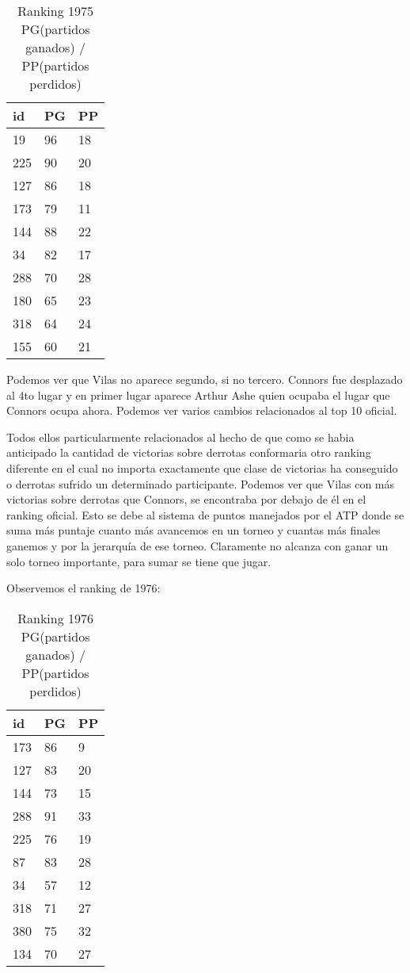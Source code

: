 \begin{table}[H]
\label{my-label}
\begin{tabular}{lll}
\hline
id  & PG & PP \\ \hline
19  & 96 & 18 \\
225 & 90 & 20 \\
127 & 86 & 18 \\
173 & 79 & 11 \\
144 & 88 & 22 \\
34  & 82 & 17 \\
288 & 70 & 28 \\
180 & 65 & 23 \\
318 & 64 & 24 \\
155 & 60 & 21 \\ \hline 
\end{tabular}
\centering
\caption{Ranking 1975 PG(partidos ganados) / PP(partidos perdidos)}
\end{table}

Podemos ver que Vilas no aparece segundo, si no tercero. Connors fue desplazado al 4to lugar y en primer lugar aparece Arthur Ashe quien ocupaba el lugar que Connors ocupa ahora. Podemos ver varios cambios relacionados al top 10 oficial.

Todos ellos particularmente relacionados al hecho de que como se habia anticipado la cantidad de victorias sobre derrotas conformaria otro ranking diferente en el cual no importa exactamente que clase de victorias ha conseguido o derrotas sufrido un determinado participante. Podemos ver que Vilas con más victorias sobre derrotas que Connors, se encontraba por debajo de él en el ranking oficial. Esto se debe al sistema de puntos manejados por el ATP donde se suma más puntaje cuanto más avancemos en un torneo y cuantas más finales ganemos y por la jerarquía de ese torneo. Claramente no alcanza con ganar un solo torneo importante, para sumar se tiene que jugar.

Observemos el ranking de 1976:

\begin{table}[H]
\label{my-label}
\begin{tabular}{lll}
\hline
id  & PG & PP \\ \hline
173 & 86 & 9 \\
127 & 83 & 20 \\
144 & 73 & 15 \\
288 & 91 & 33 \\
225 & 76 & 19 \\
87  & 83 & 28 \\
34  & 57 & 12 \\
318 & 71 & 27 \\
380 & 75 & 32 \\
134 & 70 & 27 \\ \hline 
\end{tabular}
\centering
\caption{Ranking 1976 PG(partidos ganados) / PP(partidos perdidos)}
\end{table}

